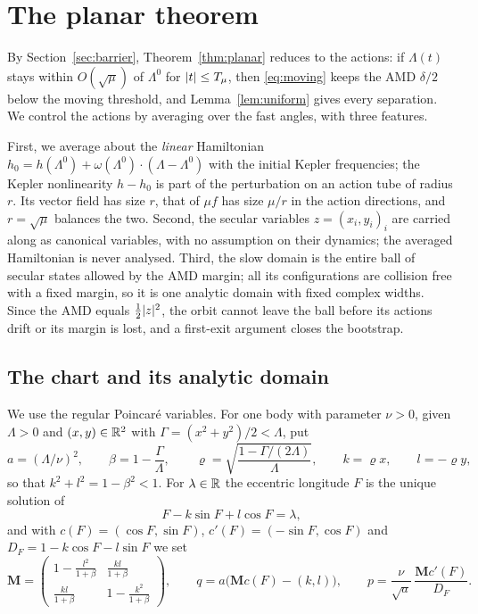 \section{The planar theorem}
\label{sec:planar}

By Section~\ref{sec:barrier}, Theorem~\ref{thm:planar} reduces to the actions: if $\Lambda(t)$ stays within $O(\sqrt\mu)$ of $\Lambda^0$ for $\lvert t\rvert\le T_\mu$, then \eqref{eq:moving} keeps the AMD $\delta/2$ below the moving threshold, and Lemma~\ref{lem:uniform} gives every separation. We control the actions by averaging over the fast angles, with three features.

First, we average about the \emph{linear} Hamiltonian $h_0=h(\Lambda^0)+\omega(\Lambda^0)\cdot(\Lambda-\Lambda^0)$ with the initial Kepler frequencies; the Kepler nonlinearity $h-h_0$ is part of the perturbation on an action tube of radius $r$. Its vector field has size $r$, that of $\mu f$ has size $\mu/r$ in the action directions, and $r=\sqrt\mu$ balances the two. Second, the secular variables $z=(x_i,y_i)_i$ are carried along as canonical variables, with no assumption on their dynamics; the averaged Hamiltonian is never analysed. Third, the slow domain is the entire ball of secular states allowed by the AMD margin; all its configurations are collision free with a fixed margin, so it is one analytic domain with fixed complex widths. Since the AMD equals $\tfrac12\lvert z\rvert^2$, the orbit cannot leave the ball before its actions drift or its margin is lost, and a first-exit argument closes the bootstrap.

\subsection{The chart and its analytic domain}

We use the regular Poincaré variables. For one body with parameter $\nu>0$, given $\Lambda>0$ and $(x,y)\in\mathbb{R}^2$ with $\Gamma=(x^2+y^2)/2<\Lambda$, put
\[
a=(\Lambda/\nu)^2,\qquad \beta=1-\frac{\Gamma}{\Lambda},\qquad \varrho=\sqrt{\frac{1-\Gamma/(2\Lambda)}{\Lambda}},\qquad k=\varrho x,\qquad l=-\varrho y,
\]
so that $k^2+l^2=1-\beta^2<1$. For $\lambda\in\mathbb{R}$ the eccentric longitude $F$ is the unique solution of
\begin{equation}
\label{eq:kepeq}
F-k\sin F+l\cos F=\lambda,
\end{equation}
and with $c(F)=(\cos F,\sin F)$, $c'(F)=(-\sin F,\cos F)$ and $D_F=1-k\cos F-l\sin F$ we set
\begin{equation}
\label{eq:chartmap}
\mathbf M=\begin{pmatrix}1-\frac{l^2}{1+\beta}&\frac{kl}{1+\beta}\\[2pt] \frac{kl}{1+\beta}&1-\frac{k^2}{1+\beta}\end{pmatrix},\qquad
q=a\big(\mathbf Mc(F)-(k,l)\big),\qquad p=\frac{\nu}{\sqrt a}\,\frac{\mathbf Mc'(F)}{D_F}.
\end{equation}

